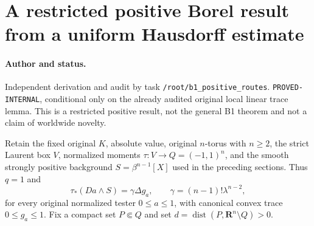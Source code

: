 \section{A restricted positive Borel result from a uniform Hausdorff estimate}
\paragraph{Author and status.}
Independent derivation and audit by task \texttt{/root/b1\_positive\_routes}.
\texttt{PROVED-INTERNAL}, conditional only on the already audited original
local linear trace lemma. This is a restricted positive result, not the
general B1 theorem and not a claim of worldwide novelty.

Retain the fixed original $K$, absolute value, original $n$-torus with
$n\ge2$, the strict Laurent box $V$, normalized moments
$\tau:V\to Q=(-1,1)^n$, and the smooth strongly positive background
$S=\beta^{n-1}[X]$ used in the preceding sections. Thus $q=1$ and
\[
 \tau_*(Da\wedge S)=\gamma\Delta g_a,
 \qquad\gamma=(n-1)!\lambda^{n-2},
\]
for every original normalized tester $0\le a\le1$, with canonical convex
trace $0\le g_a\le1$. Fix a compact set $P\Subset Q$ and set
$d=\operatorname{dist}(P,\mathbf R^n\setminus Q)>0$.

